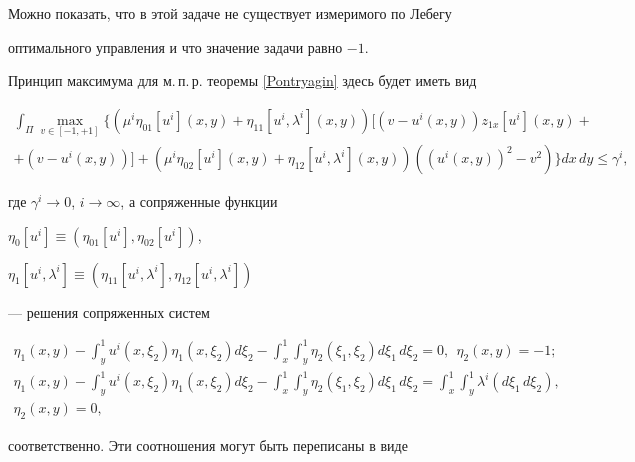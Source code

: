 Можно показать, что в этой задаче не существует измеримого по Лебегу 


оптимального управления и что значение задачи равно $-1$.





Принцип максимума для м.\,п.\,р. теоремы \ref{Pontryagin} здесь будет иметь вид


\begin{multline*}


\int_\Pi\max\limits_{v\in[-1, +1]}\{(\mu^i\eta_{01}[u^i](x, y)+


\eta_{11}[u^i, \lambda^i](x, y))[(v-u^i(x, y))z_{1 x}[u^i](x, y)+\\


%


+(v-u^i(x, y))]+(\mu^i\eta_{02}[u^i](x, y)+\eta_{12}[u^i, \lambda^i](x, y))


((u^i(x, y))^2-v^2)\} dx\, dy\leq\gamma^i,


\end{multline*}


где $\gamma^i\to 0$, $i\to\infty$, а сопряженные функции


$\eta_0[u^i]\equiv(\eta_{01}[u^i], \eta_{02}[u^i])$,


$\eta_1[u^i,\lambda^i]\equiv(\eta_{11}[u^i,\lambda^i], \eta_{12}[u^i,\lambda^i])$


--- решения сопряженных систем


\begin{gather*}


\eta_1(x, y)-\int^1_yu^i(x, \xi_2)\eta_1(x, \xi_2) d\xi_2-


\int_x^1\int^1_y\eta_2(\xi_1, \xi_2) d\xi_1\,d\xi_2=0,\ \ \eta_2(x, y)=-1;\\


%


\eta_1(x, y)-\int_y^1u^i(x, \xi_2)\eta_1(x, \xi_2) d\xi_2-


\int_x^1\int^1_y\eta_2(\xi_1, \xi_2) d\xi_1\,d\xi_2=


\int^1_x\int^1_y\lambda^i(d\xi_1\,d\xi_2),\\


%


\eta_2(x, y)=0,


\end{gather*}


соответственно. Эти соотношения могут быть переписаны в виде


